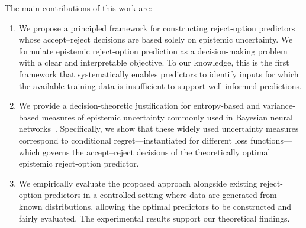 \vspace{-0.05cm}


The main contributions of this work are:
\vspace{-0.3cm}
\begin{enumerate}[leftmargin=1.1em,itemsep=1pt]
\item We propose a principled framework for constructing reject-option predictors whose accept–reject decisions are based solely on epistemic uncertainty. We formulate epistemic reject-option prediction as a decision-making problem with a clear and interpretable objective. To our knowledge, this is the first framework that systematically enables predictors to identify inputs for which the available training data is insufficient to support well-informed predictions.
%
\item We provide a decision-theoretic justification for entropy-based and variance-based measures of epistemic uncertainty commonly used in Bayesian neural networks~\cite{Depeweg-Decompos-ICML2018}. Specifically, we show that these widely used uncertainty measures correspond to conditional regret—instantiated for different loss functions—which governs the accept–reject decisions of the theoretically optimal epistemic reject-option predictor.
%
\item We empirically evaluate the proposed approach alongside existing reject-option predictors in a controlled setting where data are generated from known distributions, allowing the optimal predictors to be constructed and fairly evaluated. The experimental results support our theoretical findings.

\vspace{-0.2cm}

\end{enumerate}


